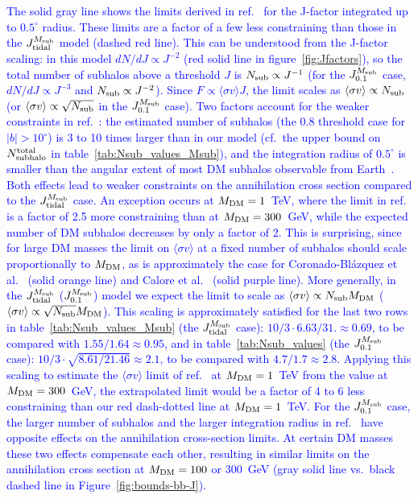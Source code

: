 \documentclass[12pt, a4paper]{article}
\newcommand{\new}[1]{\textcolor{blue}{#1}}
\newcommand{\aure}[1]{\textcolor{orange}{[AA: #1]}}
\newcommand{\sigmav}{\langle \sigma v \rangle}
\begin{document}
\new{The solid gray line shows the limits derived in ref.~\cite{2023JCAP...07..033B} for the J-factor integrated up to $0.5^\circ$ radius.
These limits are a factor of a few less constraining than those in the $J_{\rm tidal}^{M_{\rm sub}}$ model (dashed red line).
This can be understood from the J-factor scaling: in this model $dN/dJ \propto J^{-2}$ (red solid line in figure~\ref{fig:Jfactors}), so the total number of subhalos above a threshold $J$ is $N_{\rm sub} \propto J^{-1}$ (for the $J_{0.1}^{M_{\rm sub}}$ case, $dN/dJ \propto J^{-3}$ and $N_{\rm sub} \propto J^{-2}$).
Since $F \propto \sigmav J$, the limit scales as $\sigmav \propto N_{\rm sub}$ (or $\sigmav \propto \sqrt{N_{\rm sub}}$ in the $J_{0.1}^{M_{\rm sub}}$ case).
Two factors account for the weaker constraints in ref.~\cite{2023JCAP...07..033B}: the estimated number of subhalos (the 0.8 threshold case for $|b| > 10^\circ$) is 3 to 10 times larger than in our model (cf.\ the upper bound on $N_{\rm subhalo}^{\rm total}$ in table~\ref{tab:Nsub_values_Msub}), and the integration radius of $0.5^\circ$ is smaller than the angular extent of most DM subhalos observable from Earth~\cite{2019JCAP...11..045C, 2024MNRAS.530.2496A}.
Both effects lead to weaker constraints on the annihilation cross section compared to the $J_{\rm tidal}^{M_{\rm sub}}$ case.
An exception occurs at $M_{\rm DM} = 1$~TeV, where the limit in ref.~\cite{2023JCAP...07..033B} is a factor of 2.5 more constraining than at $M_{\rm DM} = 300$~GeV, while the expected number of DM subhalos decreases by only a factor of 2.
This is surprising, since for large DM masses the limit on $\sigmav$ at a fixed number of subhalos should scale proportionally to $M_{\rm DM}$, as is approximately the case for Coronado-Bl{\'a}zquez et al.~\cite{2019JCAP...11..045C} (solid orange line) and Calore et al.~\cite{2019Galax...7...90C} (solid purple line).
More generally, in the $J_{\rm tidal}^{M_{\rm sub}}$ ($J_{0.1}^{M_{\rm sub}}$) model we expect the limit to scale as
$\sigmav \propto N_{\rm sub} M_{\rm DM}$ ($\sigmav \propto \sqrt{N_{\rm sub}} M_{\rm DM}$).
This scaling is approximately satisfied for the last two rows in table~\ref{tab:Nsub_values_Msub} (the $J_{\rm tidal}^{M_{\rm sub}}$ case):
$10/3 \cdot {6.63/31.} \approx 0.69$,
to be compared with $1.55/1.64 \approx 0.95$,
and in table~\ref{tab:Nsub_values} (the $J_{0.1}^{M_{\rm sub}}$ case):
$10/3 \cdot \sqrt{8.61/21.46} \approx 2.1$,
to be compared with $4.7/1.7 \approx 2.8$.
Applying this scaling to estimate the $\sigmav$ limit of ref.~\cite{2023JCAP...07..033B} at $M_{\rm DM} = 1$~TeV from the value at $M_{\rm DM} = 300$~GeV, the extrapolated limit would be a factor of 4 to 6 less constraining than our red dash-dotted line at $M_{\rm DM} = 1$~TeV.
For the $J_{0.1}^{M_{\rm sub}}$ case, the larger number of subhalos and the larger integration radius in ref.~\cite{2023JCAP...07..033B}
have opposite effects on the annihilation cross-section limits.
At certain DM masses these two effects compensate each other, resulting in similar limits on the annihilation cross section
at $M_{\rm DM} = 100$ or 300~GeV (gray solid line vs.\ black dashed line in Figure~\ref{fig:bounds-bb-J}).
}
\end{document}

